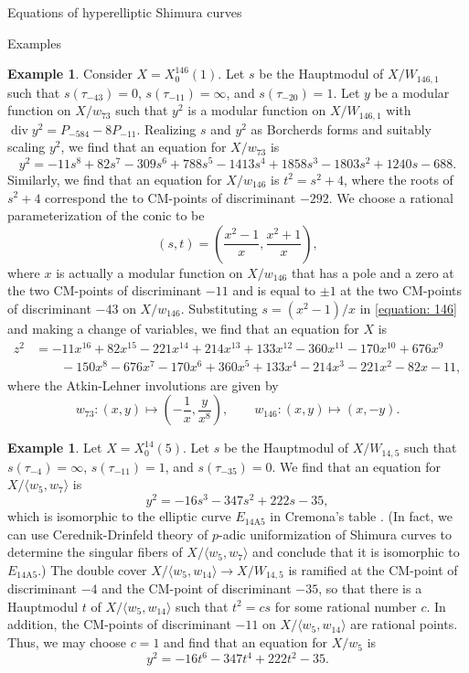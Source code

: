 \documentclass{amsart}
\newcounter{lemma}
\theoremstyle{definition}
\newtheorem{Example}[lemma]{Example}
\def\gen#1{\langle #1\rangle}
\def\div{\operatorname{div}}
\begin{document}
\begin{section}{Equations of hyperelliptic Shimura curves}
\begin{subsection}{Examples}
\begin{Example} Consider $X=X_0^{146}(1)$. Let $s$ be the Hauptmodul
  of $X/W_{146,1}$ such that $s(\tau_{-43})=0$,
  $s(\tau_{-11})=\infty$, and $s(\tau_{-20})=1$. Let $y$ be a modular
  function on $X/w_{73}$ such that $y^2$ is a modular function on
  $X/W_{146,1}$ with $\div y^2=P_{-584}-8P_{-11}$. Realizing $s$ and
  $y^2$ as Borcherds forms and suitably scaling $y^2$, we find that an
  equation for $X/w_{73}$ is
  \begin{equation} \label{equation: 146}
    y^2=-11s^8+82s^7-309s^6+788s^5-1413s^4+1858s^3-1803s^2+1240s-688.
  \end{equation}
  Similarly, we find that an equation for $X/w_{146}$ is $t^2=s^2+4$,
  where the roots of $s^2+4$ correspond the to CM-points of
  discriminant $-292$. We choose a rational parameterization of the
  conic to be
  $$
    (s,t)=\left(\frac{x^2-1}x,\frac{x^2+1}x\right),
  $$
  where $x$ is actually a modular function on $X/w_{146}$ that has a
  pole and a zero at the two CM-points of discriminant $-11$ and is
  equal to $\pm 1$ at the two CM-points of discriminant $-43$ on
  $X/w_{146}$. Substituting $s=(x^2-1)/x$ in \eqref{equation: 146} and
  making a change of variables, we find that an equation for $X$ is
  \begin{equation*}
  \begin{split}
    z^2&=-11x^{16}+82x^{15}-221x^{14}+214x^{13}+133x^{12}-360x^{11}-170x^{10}
       +676x^9 \\
   &\qquad-150x^8-676x^7-170x^6+360x^5+133x^4-214x^3-221x^2-82x-11,
  \end{split}
  \end{equation*}
  where the Atkin-Lehner involutions are given by
  $$
    w_{73}:(x,y)\mapsto\left(-\frac 1x,\frac y{x^8}\right), \qquad
    w_{146}:(x,y)\mapsto(x,-y).
  $$
\end{Example}

\begin{Example}
  Let $X=X_0^{14}(5)$. Let $s$ be the Hauptmodul of $X/W_{14,5}$ such
  that $s(\tau_{-4})=\infty$, $s(\tau_{-11})=1$, and
  $s(\tau_{-35})=0$. We find that an equation for $X/\gen{w_5,w_7}$ is
  $$
    y^2=-16s^3-347s^2+222s-35,
  $$
  which is isomorphic to the elliptic curve $E_{\text{14A5}}$ in Cremona's table
  \cite{Cremona}. (In fact, we can use Cerednik-Drinfeld theory of
  $p$-adic uniformization of Shimura curves \cite{Boutot-Carayol} to
  determine the singular fibers of $X/\langle w_5,w_7\rangle$ and conclude that
  it is isomorphic to $E_{\text{14A5}}$.) The double cover $X/\gen{w_5,w_{14}}\to
  X/W_{14,5}$ is ramified at the CM-point of discriminant $-4$ and the
  CM-point of discriminant $-35$, so that there is a Hauptmodul $t$ of
  $X/\gen{w_5,w_{14}}$ such that $t^2=cs$ for some rational number
  $c$. In addition, the CM-points of discriminant $-11$ on
  $X/\gen{w_5,w_{14}}$ are rational points. Thus, we may choose $c=1$
  and find that an equation for $X/w_5$ is
  \begin{equation} \label{equation: 14 5}
    y^2=-16t^6-347t^4+222t^2-35.
  \end{equation}


\end{Example}
\end{subsection}
\end{section}
\end{document}

